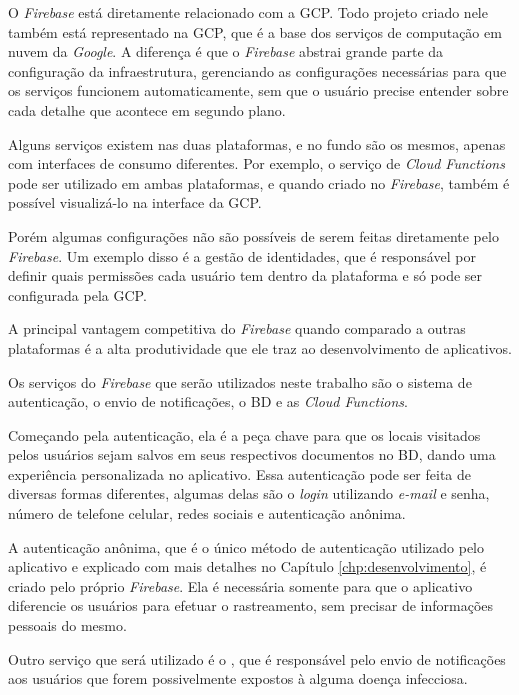 O \textit{Firebase} está diretamente relacionado com a GCP. Todo projeto criado nele também está representado na GCP, que é a base dos serviços de computação em nuvem da \textit{Google}. A diferença é que o \textit{Firebase} abstrai grande parte da configuração da infraestrutura, gerenciando as configurações necessárias para que os serviços funcionem automaticamente, sem que o usuário precise entender sobre cada detalhe que acontece em segundo plano.

Alguns serviços existem nas duas plataformas, e no fundo são os mesmos, apenas com interfaces de consumo diferentes. Por exemplo, o serviço de \textit{Cloud Functions} pode ser utilizado em ambas plataformas, e quando criado no \textit{Firebase}, também é possível visualizá-lo na interface da GCP.

Porém algumas configurações não são possíveis de serem feitas diretamente pelo \textit{Firebase}. Um exemplo disso é a gestão de identidades, que é responsável por definir quais permissões cada usuário tem dentro da plataforma e só pode ser configurada pela GCP.

A principal vantagem competitiva do \textit{Firebase} quando comparado a outras plataformas é a alta produtividade que ele traz ao desenvolvimento de aplicativos.

Os serviços do \textit{Firebase} que serão utilizados neste trabalho são o sistema de autenticação, o envio de notificações, o BD e as \textit{Cloud Functions}.

Começando pela autenticação, ela é a peça chave para que os locais visitados pelos usuários sejam salvos em seus respectivos documentos no BD, dando uma experiência personalizada no aplicativo. Essa autenticação pode ser feita de diversas formas diferentes, algumas delas são o \textit{login} utilizando \textit{e-mail} e senha, número de telefone celular, redes sociais e autenticação anônima.

A autenticação anônima, que é o único método de autenticação utilizado pelo aplicativo e explicado com mais detalhes no Capítulo \ref{chp:desenvolvimento}, é criado pelo próprio \textit{Firebase}. Ela é necessária somente para que o aplicativo diferencie os usuários para efetuar o rastreamento, sem precisar de informações pessoais do mesmo.

Outro serviço que será utilizado é o , que é responsável pelo envio de notificações aos usuários que forem possivelmente expostos à alguma doença infecciosa.


